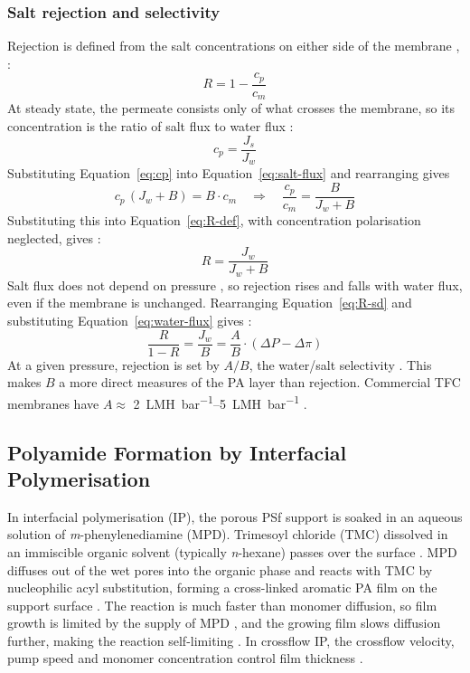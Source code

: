 \subsubsection{Salt rejection and selectivity}
Rejection is defined from the salt concentrations on either side of the membrane \citep[Eq.~42]{Wijmans1995}, \citep[Eq.~2]{Lonsdale1965}:
\begin{equation}
  R = 1 - \frac{c_p}{c_m}
  \label{eq:R-def}
\end{equation}
At steady state, the permeate consists only of what crosses the membrane, so its concentration is the ratio of salt flux to water flux \citep[Eq.~15]{Lonsdale1965}:
\begin{equation}
  c_p = \frac{J_s}{J_w}
  \label{eq:cp}
\end{equation}
Substituting Equation~\ref{eq:cp} into Equation~\ref{eq:salt-flux} and rearranging gives
\begin{equation}
  c_p\,(J_w + B) = B\cdot c_m \quad\Rightarrow\quad \frac{c_p}{c_m} = \frac{B}{J_w + B}
  \label{eq:cp-cm}
\end{equation}
Substituting this into Equation~\ref{eq:R-def}, with concentration polarisation neglected, gives \citep[Eq.~5]{Werber2016}:
\begin{equation}
  R = \frac{J_w}{J_w + B}
  \label{eq:R-sd}
\end{equation}
Salt flux does not depend on pressure \citep[p.~10]{Wijmans1995}, so rejection rises and falls with water flux, even if the membrane is unchanged. Rearranging Equation~\ref{eq:R-sd} and substituting Equation~\ref{eq:water-flux} gives \citep[Eq.~5]{Werber2016}:
\begin{equation}
  \frac{R}{1-R} = \frac{J_w}{B} = \frac{A}{B}\cdot(\Delta P - \Delta\pi)
  \label{eq:R-AB}
\end{equation}
At a given pressure, rejection is set by $A/B$, the water/salt selectivity \citep{Werber2016}. This makes $B$ a more direct measures of the PA layer than rejection. Commercial TFC membranes have $A \approx$ \qtyrange{2}{5}{LMH.bar^{-1}} \citep{Werber2016}. 

\subsection{Polyamide Formation by Interfacial Polymerisation}
\label{sec:lit-ip}

In interfacial polymerisation (IP), the porous PSf support is soaked in an aqueous solution of \textit{m}-phenylenediamine (MPD). Trimesoyl chloride (TMC) dissolved in an immiscible organic solvent (typically \textit{n}-hexane) passes over the surface \citep{Wang2026,GhoshHoek2009}. MPD diffuses out of the wet pores into the organic phase and reacts with TMC by nucleophilic acyl substitution, forming a cross-linked aromatic PA film on the support surface \citep{Wang2026,Farahbakhsh2024}. The reaction is much faster than monomer diffusion, so film growth is limited by the supply of MPD \citep{GhoshHoek2009,Ogbe2025}, and the growing film slows diffusion further, making the reaction self-limiting \citep{Wang2026,Chen2024}. In crossflow IP, the crossflow velocity, pump speed and monomer concentration control film thickness \citep{Ogbe2026}.

